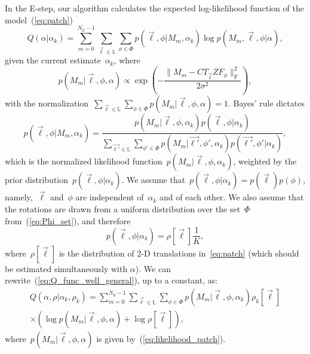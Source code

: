 \documentclass{article}
\begin{document}
In the E-step, our algorithm calculates the expected log-likelihood function of the model~(\ref{eq:patch})
\begin{equation}
\label{eq:Q_func_well_general}
Q(\alpha|\alpha_k) = \sum_{m = 0}^{N_d - 1} \sum_{\vec{\ell} \in \mathbb{L}} \sum_{\phi \in \Phi} p(\vec{\ell}, \phi|M_m, \alpha_k) \log p(M_m, \vec{\ell}, \phi|\alpha),
\end{equation}
given the current estimate~$\alpha_k$, where
\begin{equation}
\label{eq:likelihood_patch}
p(M_m|\vec{\ell}, \phi, \alpha) \propto \exp \left(- \frac{\|M_m - C T_{\vec{l}} Z F_{\phi}\|_\text{F}^2}{2 \sigma^2} \right),
\end{equation}
with the normalization~\mbox{$\sum_{\vec{\ell} \in \mathbb{L}} \sum_{\phi \in \Phi} p(M_m|\vec{\ell}, \phi, \alpha) = 1$}. Bayes' rule dictates
\begin{equation}
p(\vec{\ell}, \phi|M_m, \alpha_k) = \frac{p(M_m|\vec{\ell}, \phi, \alpha_k) p(\vec{\ell}, \phi|\alpha_k)}{\sum_{\vec{\ell'} \in \mathbb{L}} \sum_{\phi' \in \Phi} p(M_m|\vec{\ell'}, \phi', \alpha_k) p(\vec{\ell'}, \phi'|\alpha_k)},
\end{equation}
which is the normalized likelihood function~$p(M_m|\vec{\ell}, \phi, \alpha_k)$, weighted by the prior distribution~$p(\vec{\ell}, \phi| \alpha_k)$. We assume that~$p(\vec{\ell},\phi|\alpha_k)=p(\vec{\ell})p(\phi)$, namely,~$\vec{\ell}$ and~$\phi$ are independent of~$\alpha_k$ and of each other.
We also assume that the rotations are drawn from a uniform distribution over the set~$\Phi$ from~(\ref{eq:Phi_set}), and therefore
\begin{equation}
p(\vec{\ell}, \phi|\alpha_k) = \rho[\vec{\ell}] \frac{1}{K},
\end{equation}
where~$\rho[\vec{\ell}]$ is the distribution of 2-D translations in~\eqref{eq:patch} (which should be estimated simultaneously with $\alpha$). We can rewrite~(\ref{eq:Q_func_well_general}), up to a constant, as:
\begin{multline}
Q(\alpha, \rho|\alpha_k, \rho_k) = \sum_{m = 0}^{N_d - 1} \sum_{\vec{\ell} \in \mathbb{L}} \sum_{\phi \in \Phi} p(M_m|\vec{\ell}, \phi, \alpha_k) \rho_k[\vec{\ell}] \\ \times \left(\log p(M_m|\vec{\ell}, \phi, \alpha) + \log \rho[\vec{\ell}]\right),
\end{multline}
where~$p(M_m|\vec{\ell}, \phi, \alpha)$ is given by~(\ref{eq:likelihood_patch}).
\end{document}
